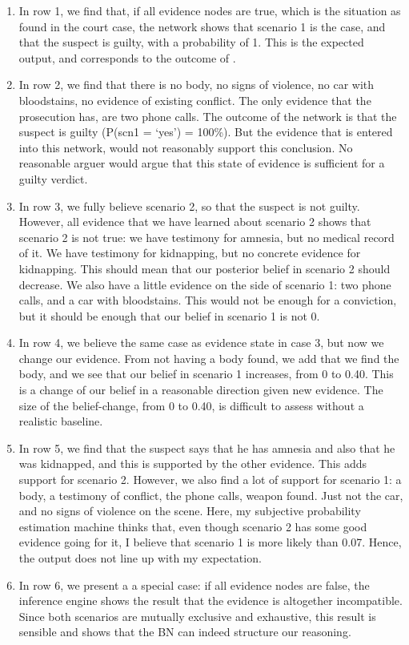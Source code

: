 \documentclass[12pt]{article}
\begin{document}
\begin{enumerate}
\item In row 1, we find that, if all evidence nodes are true, which is the situation as found in the court case, the network shows that scenario 1 is the case, and that the suspect is guilty, with a probability of 1. This is the expected output, and corresponds to the outcome of \citet{vanLeeuwen2019}.
\item In row 2, we find that there is no body, no signs of violence, no car with bloodstains, no evidence of existing conflict. The only evidence that the prosecution has, are two phone calls. The outcome of the network is that the suspect is guilty (P(scn1 = `yes') = 100\%). But the evidence that is entered into this network, would not reasonably support this conclusion. No reasonable arguer would argue that this state of evidence is sufficient for a guilty verdict.
\item In row 3, we fully believe scenario 2, so that the suspect is not guilty. However, all evidence that we have learned about scenario 2 shows that scenario 2 is not true: we have testimony for amnesia, but no medical record of it. We have testimony for kidnapping, but no concrete evidence for kidnapping. This should mean that our posterior belief in scenario 2 should decrease. We also have a little evidence on the side of scenario 1: two phone calls, and a car with bloodstains. This would not be enough for a conviction, but it should be enough that our belief in scenario 1 is not 0.
\item In row 4, we believe the same case as evidence state in case 3, but now we change our evidence. From not having a body found, we add that we find the body, and we see that our belief in scenario 1 increases, from 0 to 0.40. This is a change of our belief in a reasonable direction given new evidence. The size of the belief-change, from 0 to 0.40, is difficult to assess without a realistic baseline.
\item In row 5, we find that the suspect says that he has amnesia and also that he was kidnapped, and this is supported by the other evidence. This adds support for scenario 2. However, we also find a lot of support for scenario 1: a body, a testimony of conflict, the phone calls, weapon found. Just not the car, and no signs of violence on the scene. Here, my subjective probability estimation machine thinks that, even though scenario 2 has some good evidence going for it, I believe that scenario 1 is more likely than 0.07. Hence, the output does not line up with my expectation.
\item In row 6, we present a a special case: if all evidence nodes are false, the inference engine shows the result that the evidence is altogether incompatible. Since both scenarios are mutually exclusive and exhaustive, this result is sensible and shows that the BN can indeed structure our reasoning.
\end{enumerate}
\end{document}
